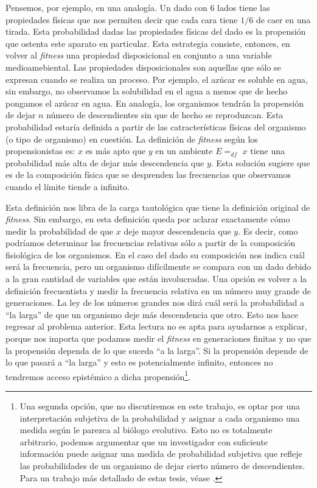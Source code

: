 Pensemos, por ejemplo, en una analogía. Un dado con 6 lados tiene las propiedades físicas que nos permiten decir que cada cara tiene $1/6$ de caer en una tirada. Esta probabilidad dadas las propiedades físicas del dado es la propensión que ostenta este aparato en particular. Esta estrategia consiste, entonces, en volver al \emph{fitness} una propiedad disposicional en conjunto a una variable medioamebiental. Las propiedades disposicionales son aquellas que sólo se expresan cuando se realiza un proceso. Por ejemplo, el azúcar es soluble en agua, sin embargo, no observamos la solubilidad en el agua a menos que de hecho pongamos el azúcar en agua. En analogía, los organismos tendrán la propensión de dejar $n$ número de descendientes sin que de hecho se reproduzcan. Esta probabilidad estaría definida a partir de las catracterísticas físicas del organismo (o tipo de organismo) en cuestión. La definición de \emph{fitness} según los propensionistas es: $x$ es más apto que $y$ en un ambiente $E =_{df}$ $x$ tiene una probabilidad más alta de dejar más descendencia que $y$. Esta solución sugiere que es de la composición física que se desprenden las frecuencias que observamos cuando el límite tiende a infinito.

Esta definición nos libra de la carga tautológica que tiene la definición original de \emph{fitness}. Sin embargo, en esta definición queda por aclarar exactamente cómo medir la probabilidad de que $x$ deje mayor descendencia que $y$. Es decir, como podríamos determinar las frecuencias relativas sólo a partir de la composición fisiológica de los organismos. En el caso del dado su composición nos indica cuál será la frecuencia, pero un organismo difícilmente se compara con un dado debido a la gran cantidad de variables que están involucradas. Una opción es volver a la definición frecuentista y medir la frecuencia relativa en un número muy grande de generaciones. La ley de los números grandes nos dirá cuál será la probabilidad a ``la larga'' de que un organismo deje más descendencia que otro. Esto nos hace regresar al problema anterior. Esta lectura no es apta para ayudarnos a explicar, porque nos importa que podamos medir el \emph{fitness} en generaciones finitas y no que la propensión dependa de lo que suceda ``a la larga''. Si la propensión depende de lo que pasará a ``la larga'' y esto es potencialmente infinito, entonces no tendremos acceso epistémico a dicha propensión\footnote{Una segunda opción, que no discutiremos en este trabajo, es optar por una interpretación subjetiva de la probabilidad y asignar a cada organismo una medida según le parezca al biólogo evolutivo. Esto no es totalmente arbitrario, podemos argumentar que un investigador con suficiente información puede asignar una medida de probabilidad subjetiva que refleje las probabilidades de un organismo de dejar cierto número de descendientes. Para un trabajo más detallado de estas tesis, véase \cite{Suarez2021}.}.

